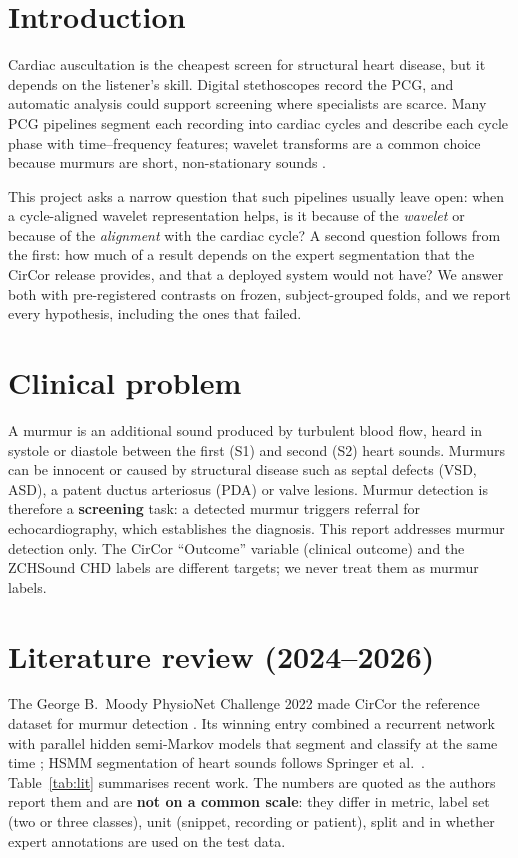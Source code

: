 \documentclass[11pt,a4paper]{article}
\begin{document}
\section{Introduction}
Cardiac auscultation is the cheapest screen for structural heart disease, but it depends on the listener's skill. Digital
stethoscopes record the PCG, and automatic analysis could support screening where specialists are scarce. Many PCG
pipelines segment each recording into cardiac cycles and describe each cycle phase with time--frequency features; wavelet
transforms are a common choice because murmurs are short, non-stationary sounds \cite{vimalajeewa2025}.

This project asks a narrow question that such pipelines usually leave open: when a cycle-aligned wavelet representation
helps, is it because of the \emph{wavelet} or because of the \emph{alignment} with the cardiac cycle? A second question
follows from the first: how much of a result depends on the expert segmentation that the CirCor release provides, and
that a deployed system would not have? We answer both with pre-registered contrasts on frozen, subject-grouped folds, and
we report every hypothesis, including the ones that failed.

\section{Clinical problem}
A murmur is an additional sound produced by turbulent blood flow, heard in systole or diastole between the first (S1) and
second (S2) heart sounds. Murmurs can be innocent or caused by structural disease such as septal defects (VSD, ASD), a
patent ductus arteriosus (PDA) or valve lesions. Murmur detection is therefore a \textbf{screening} task: a detected
murmur triggers referral for echocardiography, which establishes the diagnosis. This report addresses murmur detection
only. The CirCor ``Outcome'' variable (clinical outcome) and the ZCHSound CHD labels are different targets; we never
treat them as murmur labels.

\section{Literature review (2024--2026)}
The George B.\ Moody PhysioNet Challenge 2022 made CirCor the reference dataset for murmur detection \cite{oliveira2022,reyna2023}.
Its winning entry combined a recurrent network with parallel hidden semi-Markov models that segment and classify at the
same time \cite{mcdonald2024}; HSMM segmentation of heart sounds follows Springer et al.\ \cite{springer2016}. Table~\ref{tab:lit}
summarises recent work. The numbers are quoted as the authors report them and are \textbf{not on a common scale}: they
differ in metric, label set (two or three classes), unit (snippet, recording or patient), split and in whether expert
annotations are used on the test data.
\end{document}
